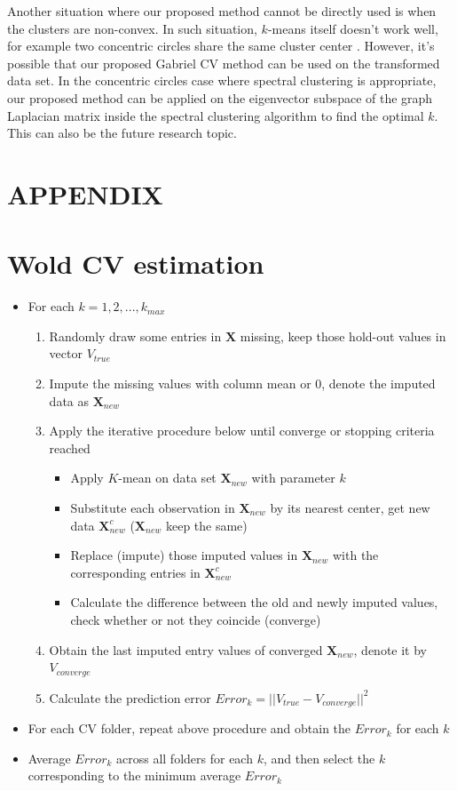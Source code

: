 \documentclass[12pt]{article}
\begin{document}
Another situation where our proposed method cannot be directly used is when the clusters 
are non-convex. In such situation, $k$-means itself doesn't work well, for example two 
concentric circles share the same cluster center \citep{hastie2009elements}. However, it's 
possible that our proposed Gabriel CV method can be used on the transformed data set. In the
concentric circles case where spectral clustering is appropriate, our proposed method can be applied 
on the eigenvector subspace of the graph Laplacian matrix inside the spectral clustering algorithm
to find the optimal $k$. This can also be the future research topic. 

\clearpage

\section*{\textbf{APPENDIX}}
\appendix
\section{Wold CV estimation} \label{app:foobar}
\begin{itemize}
	\item For each $k = 1,2,...,k_{max}$
	\begin{enumerate}
		\item Randomly draw some entries in $\mathbf{X}$ missing, keep those hold-out values in vector $V_{true}$
		\item Impute the missing values with column mean or $0$, denote the imputed data as $\mathbf{X}_{new}$
		\item Apply the iterative procedure below until converge or stopping criteria reached
		\begin{itemize}
			\item Apply $K$-mean on data set $\mathbf{X}_{new}$ with parameter $k$
			\item Substitute each observation in $\mathbf{X}_{new}$ by its nearest center, get new data $\mathbf{X}^c_{new}$ ($\mathbf{X}_{new}$ keep the same)
			\item Replace (impute) those imputed values in $\mathbf{X}_{new}$ with the corresponding entries in $\mathbf{X}^c_{new}$
			\item Calculate the difference between the old and newly imputed values, check whether or not they coincide (converge) 
		\end{itemize}
		\item Obtain the last imputed entry values of converged $\mathbf{X}_{new}$, denote it by $V_{converge}$
		\item Calculate the prediction error  $Error_k = ||V_{true} - V_{converge}||^2$ 
	\end{enumerate}
	\item For each CV folder, repeat above procedure and obtain the $Error_k$ for each $k$
	\item Average $Error_k$ across all folders for each $k$, and then select the $k$ corresponding to the minimum average $Error_k$ 
\end{itemize}
\end{document}
